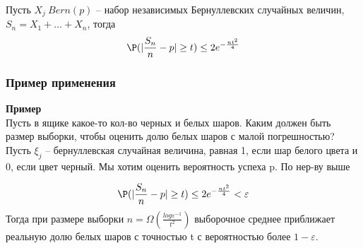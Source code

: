 \begin{theorem*}[следствие]
    Пусть $X_j ~ Bern(p) $ -- набор независимых Бернуллевских случайных величин, $S_n = X_1 + \dots + X_n$, тогда
    \begin{equation*}
        \P(|\frac{S_n}{n} - p| \geq t) \leq 2e^{-\frac{nt^2}{4}}
    \end{equation*}
\end{theorem*}

\subsubsection{Пример применения}
\textbf{Пример}\\
Пусть в ящике какое-то кол-во черных и белых шаров. Каким должен быть размер выборки, чтобы оценить долю белых шаров с малой погрешностью? Пусть $\xi_j $ -- бернуллевская случайная величина, равная 1, если шар белого цвета и 0, если цвет черный. Мы хотим оценить вероятность успеха p. По нер-ву выше

\begin{equation*}
    \P(|\frac{S_n}{n} - p| \geq t) \leq 2e^{-\frac{nt^2}{4}} < \varepsilon
\end{equation*}
Тогда при размере выборки $n = \Omega(\frac{log\varepsilon^{-1}}{t^2})$ выборочное среднее приближает реальную долю белых шаров с точностью t с вероятностью более $1 - \varepsilon$.



